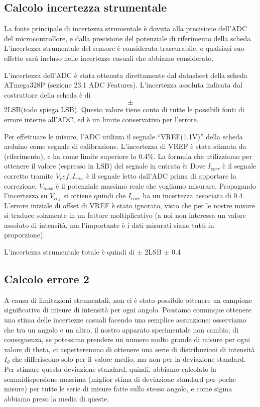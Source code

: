 \documentclass[12pt, a4paper, twoside]{article}
\begin{document}
  \subsection{Calcolo incertezza strumentale}
    La fonte principale di incertezza strumentale è dovuta alla precisione dell’ADC del microcontrollore, e dalla precisione del potenziale di riferimento della scheda.
    L’incertezza strumentale del sensore è considerata trascurabile, e qualsiasi suo effetto sarà incluso nelle incertezze casuali che abbiamo considerato.

    L’incertezza dell’ADC è stata ottenuta direttamente dal datasheet della scheda ATmega328P (sezione 23.1 ADC
  Features). L’incertezza assoluta indicata dal costruttore della scheda è di $$\pm$$ 2LSB(todo spiega LSB). Questo
  valore tiene conto di tutte le possibili fonti di errore interne all’ADC, ed è un limite conservativo per l’errore.

    Per effettuare le misure, l’ADC utilizza il segnale “VREF(1.1V)” della scheda arduino come segnale di
calibrazione. L’incertezza di VREF è stata stimata da (riferimento), e ha come limite superiore lo 0.4\%. La formula
che utilizziamo per ottenere il valore (espresso in LSB) del segnale in entrata è:
    Dove $I_{corr}$ è il segnale corretto tramite $V_ref, I_{raw}$ è il segnale letto dall’ADC prima di apportare la correzione, $V_{max}$ è il potenziale massimo reale che vogliamo misurare.
    Propagando l’incertezza su $V_{ref}$ si ottiene quindi che $I_{corr}$ ha un incertezza associata di 0.4%
    L’errore iniziale di offset di VREF è stato ignorato, visto che per le nostre misure si traduce solamente in un fattore moltiplicativo (a noi non interessa un valore assoluto di intensità, ma l’importante è i dati misurati siano tutti in proporzione).

    L’incertezza strumentale totale è quindi di $\pm$ 2LSB $\pm$ 0.4%

  \subsection{Calcolo errore 2}
    A causa di limitazioni strumentali, non ci è stato possibile ottenere un campione
    significativo di misure di intensità per ogni angolo. Possiamo comunque ottenere
    una stima delle incertezze casuali facendo una semplice assunzione: osserviamo che
    tra un angolo e un altro, il nostro apparato sperimentale non cambia; di conseguenza,
    se potessimo prendere un numero molto grande di misure per ogni valore di theta,
    ci aspetteremmo di ottenere una serie di distribuzioni di intensità $I_\theta$
che differiscono solo per il valore medio, ma non per la deviazione standard.
Per stimare questa deviazione standard, quindi, abbiamo calcolato la semmidispersione
massima (miglior stima di deviazione standard per poche misure) per tutte le serie
di misure fatte sullo stesso angolo, e come sigma abbiamo preso la media di queste.
\end{document}
